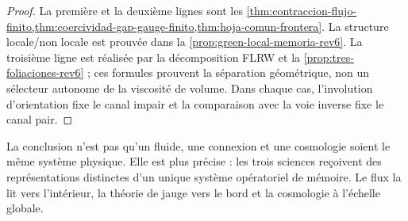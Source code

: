 \begin{proof}
La première et la deuxième lignes sont les
\cref{thm:contraccion-flujo-finito,thm:coercividad-gap-gauge-finito,thm:hoja-comun-frontera}.
La structure locale/non locale est prouvée dans la
\cref{prop:green-local-memoria-rev6}. La troisième ligne est réalisée par la
décomposition FLRW et la \cref{prop:tres-foliaciones-rev6} ; ces formules
prouvent la séparation géométrique, non un sélecteur autonome de la viscosité
de volume. Dans chaque cas, l'involution d'orientation fixe le canal impair et
la comparaison avec la voie inverse fixe le canal pair.
\end{proof}

La conclusion n'est pas qu'un fluide, une connexion et une cosmologie soient le
même système physique. Elle est plus précise : les trois sciences reçoivent
des représentations distinctes d'un unique système opératoriel de mémoire. Le flux la
lit vers l'intérieur, la théorie de jauge vers le bord et la cosmologie à
l'échelle globale.
